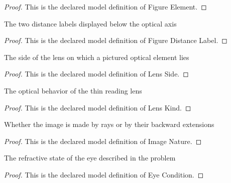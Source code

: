 \begin{proof}
  This is the declared model definition of Figure Element.
\end{proof}
\begin{definition}
  \label{def:physics:phyx-mini-0129:phyxminiproblems-problemphyxmini0129-figuredistancelabel}
  The two distance labels displayed below the optical axis
\end{definition}
\begin{proof}
  This is the declared model definition of Figure Distance Label.
\end{proof}
\begin{definition}
  \label{def:physics:phyx-mini-0129:phyxminiproblems-problemphyxmini0129-lensside}
  The side of the lens on which a pictured optical element lies
\end{definition}
\begin{proof}
  This is the declared model definition of Lens Side.
\end{proof}
\begin{definition}
  \label{def:physics:phyx-mini-0129:phyxminiproblems-problemphyxmini0129-lenskind}
  The optical behavior of the thin reading lens
\end{definition}
\begin{proof}
  This is the declared model definition of Lens Kind.
\end{proof}
\begin{definition}
  \label{def:physics:phyx-mini-0129:phyxminiproblems-problemphyxmini0129-imagenature}
  Whether the image is made by rays or by their backward extensions
\end{definition}
\begin{proof}
  This is the declared model definition of Image Nature.
\end{proof}
\begin{definition}
  \label{def:physics:phyx-mini-0129:phyxminiproblems-problemphyxmini0129-eyecondition}
  The refractive state of the eye described in the problem
\end{definition}
\begin{proof}
  This is the declared model definition of Eye Condition.
\end{proof}
